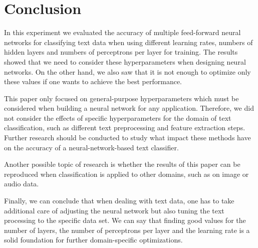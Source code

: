 \documentclass[sigconf]{acmart}
\begin{document}
\section{Conclusion}

In this experiment we evaluated the accuracy of multiple feed-forward neural networks for classifying text data when using different learning rates, numbers of hidden layers and numbers of perceptrons per layer for training. The results showed that we need to consider these hyperparameters when designing neural networks. On the other hand, we also saw that it is not enough to optimize only these values if one wants to achieve the best performance.

This paper only focused on general-purpose hyperparameters which must be considered when building a neural network for any application. Therefore, we did not consider the effects of specific hyperparameters for the domain of text classification, such as different text preprocessing and feature extraction steps. Further research should be conducted to study what impact these methods have on the accuracy of a neural-network-based text classifier.

Another possible topic of research is whether the results of this paper can be reproduced when classification is applied to other domains, such as on image or audio data.

Finally, we can conclude that when dealing with text data, one has to take additional care of adjusting the neural network but also tuning the text processing to the specific data set. We can say that finding good values for the number of layers, the number of perceptrons per layer and the learning rate is a solid foundation for further domain-specific optimizations.



\end{document}

